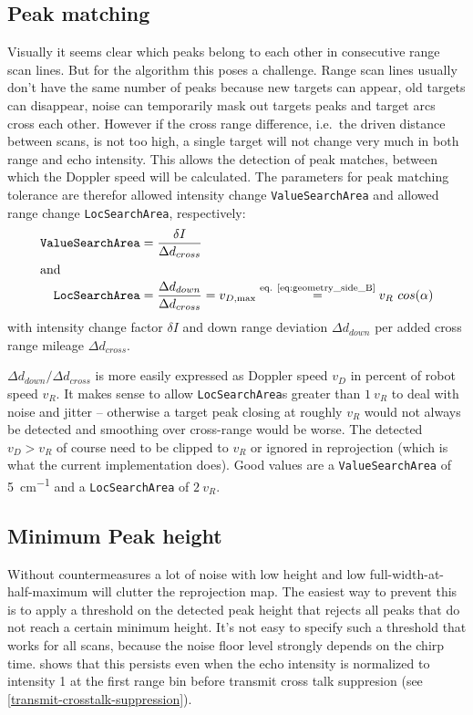 \subsection{Peak matching}\label{peak-matching}

Visually it seems clear which peaks belong to each other in consecutive
range scan lines. But for the algorithm this poses a challenge. Range
scan lines usually don't have the same number of peaks because new
targets can appear, old targets can disappear, noise can temporarily
mask out targets peaks and target arcs cross each other. However if the
cross range difference, i.e.~the driven distance between scans, is not
too high, a single target will not change very much in both range and
echo intensity. This allows the detection of peak matches, between which
the Doppler speed will be calculated. The parameters for peak matching
tolerance are therefor allowed intensity change \texttt{ValueSearchArea} and allowed range change \texttt{LocSearchArea}, respectively:
\begin{align}
    \text{\texttt{ValueSearchArea}} &= \frac{\delta I}{\Delta d_{cross}}\\
\intertext{and}
    \text{\texttt{LocSearchArea}} &= \frac{\Delta d_{down}}{\Delta d_{cross}} = v_{D,\max} \stackrel{\text{eq. \ref{eq:geometry_side_B}}}{=} v_R~cos(\alpha)
\end{align}
with intensity change factor $\delta I$ and down range deviation $\Delta d_{down}$ per added cross range mileage $\Delta d_{cross}$.

$\Delta d_{down} / \Delta d_{cross}$ is more easily expressed as Doppler speed \(v_D\) in percent of robot speed \(v_R\). It makes sense to allow \texttt{LocSearchArea}s greater than $1~v_R$ to deal with noise and jitter -- otherwise a target peak closing at roughly $v_R$ would not always be detected and smoothing over cross-range would be worse. The detected $v_D > v_R$ of course need to be clipped to $v_R$ or ignored in reprojection (which is what the current implementation does). Good values are a \texttt{ValueSearchArea} of \SI{5}{cm^{-1}} and a \texttt{LocSearchArea} of \(2~v_R\).

\subsection{Minimum Peak height}\label{minimum-peak-height}
Without countermeasures a lot of noise with low height and low full-width-at-half-maximum will clutter the reprojection map. The easiest way to prevent this is to apply a threshold on the detected peak height that rejects all peaks that do not reach a certain minimum height. It's not easy to specify such a threshold that works for all scans, because the noise floor level strongly depends on the chirp time.  shows that this persists even when the echo intensity is normalized to intensity 1 at the first range bin before transmit cross talk suppresion (see \cref{transmit-crosstalk-suppression}).

